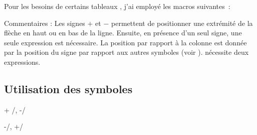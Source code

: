 \medskip
Pour les besoins de certains tableaux , j'ai employé les macros suivantes~:

\begin{tkzexample}
	\newcommand*{\va}{\colorbox{red!50}    {$\scriptscriptstyle V_a$}}
	\newcommand*{\vb}{\colorbox{blue!50}   {$\scriptscriptstyle V_b$}}
	\newcommand*{\vbo}{\colorbox{blue!50}  {$\scriptscriptstyle V_{b1}$}}
	\newcommand*{\vbt}{\colorbox{yellow!50}{$\scriptscriptstyle V_{b2}$}}
	\newcommand*{\vc}{\colorbox{gray!50}   {$\scriptscriptstyle V_c$}} 
	\newcommand*{\vd}{\colorbox{magenta!50}{$\scriptscriptstyle V_d$}} 
	\newcommand*{\ve}{\colorbox{orange!50} {$\scriptscriptstyle V_e$}}
\end{tkzexample}

\medskip
 \begin{center}
\end{center}

\begin{tkzexample}
\end{tkzexample}  

Commentaires : Les signes $+$ et $-$ permettent de positionner une extrémité de la flèche en haut ou en bas de la ligne. Ensuite, en présence d'un seul signe, une seule expression est nécessaire. La position par rapport à la colonne est donnée par la position du signe par rapport aux autres symboles (voir ).   nécessite deux expressions. 

\subsection{Utilisation des symboles}

\medskip
\bgroup\parindent=0pt
\begin{minipage}{7cm} 
\begin{tkzexample}
 {+ /\va , -/\vb }
\end{tkzexample}
\end{minipage}
\hfill 
\begin{minipage}{7cm}
\begin{tkzexample}
 {-/\va   ,   +/\vb}
\end{tkzexample}
\end{minipage}

